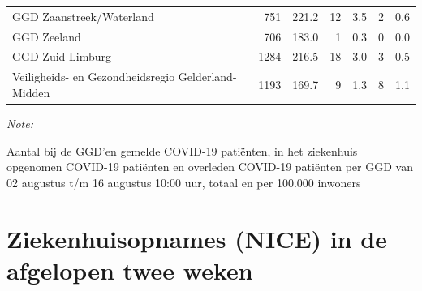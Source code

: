 \documentclass[
  english,
  man,floatsintext]{apa6}
\begin{document}
\begin{table}
\begin{threeparttable}
\begin{tabular}{lrrrrrr}
GGD Zaanstreek/Waterland & 751 & 221.2 & 12 & 3.5 & 2 & 0.6\\
GGD Zeeland & 706 & 183.0 & 1 & 0.3 & 0 & 0.0\\
GGD Zuid-Limburg & 1284 & 216.5 & 18 & 3.0 & 3 & 0.5\\
Veiligheids- en Gezondheidsregio Gelderland-Midden & 1193 & 169.7 & 9 & 1.3 & 8 & 1.1\\
\bottomrule
\end{tabular}
\begin{tablenotes}
\item \textit{Note: } 
\item Aantal bij de GGD’en gemelde COVID-19 patiënten, in het ziekenhuis opgenomen COVID-19 patiënten en overleden COVID-19 patiënten per GGD van 02 augustus t/m 16 augustus 10:00 uur, totaal en per 100.000 inwoners
\end{tablenotes}
\end{threeparttable}
\endgroup{}
\end{table}

\newpage

\hypertarget{ziekenhuisopnames-nice-in-de-afgelopen-twee-weken}{%
\section{Ziekenhuisopnames (NICE) in de afgelopen twee weken}\label{ziekenhuisopnames-nice-in-de-afgelopen-twee-weken}}
\end{document}
